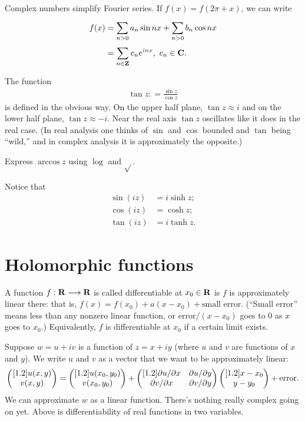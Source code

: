 \documentclass[11pt, oneside,margin=1in]{article}
\begin{document}
Complex numbers simplify Fourier series. If $f(x) =f(2\pi+x)$, we can write
\begin{align*}
	f(x) &=  \sum_{n>0}^{} a_n\sin nx + \sum_{n>0}^{} b_n\cos nx\\
	     &= \sum_{n\in\mathbf Z}^{} c_ne^{inx},\ c_n\in \mathbf C.
\end{align*}

The function
\begin{align*}
	\tan z: = \frac{\sin z}{\cos z}
\end{align*}
is defined in the obvious way. On the upper half plane, $\tan z \approx i$ and on the lower half plane, $\tan z \approx -i$. Near the real axis $\tan z$ oscillates like it does in the real case. (In real analysis one thinks of $\sin$ and $\cos$ bounded and $\tan$ being ``wild,'' and in complex analysis it is approximately the opposite.)

 \begin{exercise}\label{}\text{}
Express $\arccos z$ using $\log$ and $\sqrt{} $.
\end{exercise}

Notice that 
\begin{align*}
	\sin (iz) &= i\sinh z;\\
	\cos (iz) &= \cosh z;\\
	\tan (iz) &= i\tanh z.
\end{align*}

\section{Holomorphic functions}
A function $f:\mathbf R\longrightarrow \mathbf R$ is called differentiable at $x_0\in \mathbf R$ is $f$ is approximately linear there: that is, $f(x)= f (x_0)+a (x-x_0) + \textrm{small error}$. (``Small error'' means less than any nonzero linear function, or $\mathrm{error}/(x-x_0)$ goes to $0$ as $x$ goes to $x_0$.) Equivalently, $f$ is differentiable at $x_0$ if a certain limit exists. 

Suppose $w=u+iv$ is a function of $z=x+iy$ (where $u$ and $v$ are functions of $x$ and $y$). We write $u$ and $v$ as a vector that we want to be approximately linear:
 \begin{align*}
	 \begin{pmatrix} [ 1.2 ] u(x,y) \\ v (x,y)\end{pmatrix} = \begin{pmatrix} [ 1.2 ] u (x_0,y_0) \\ v (x_0,y_0)\end{pmatrix} + \begin{pmatrix} [ 1.2 ] \partial u/\partial x&\partial u/\partial y\\ \partial v/\partial x&\partial v / \partial y\end{pmatrix}\begin{pmatrix} [ 1.2 ] x-x_0\\y-y_0\end{pmatrix} + \mathrm{error}.
\end{align*}
We can approximate $w$ as a linear function. There's nothing really complex going on yet. Above is differentiability of real functions in two variables. 
\end{document}
